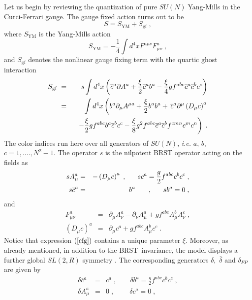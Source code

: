 \documentclass[a4paper,12pt]{article}
\begin{document}
Let us begin by reviewing the quantization of pure $SU(N)\;$Yang-Mills in
the Curci-Ferrari gauge. The gauge fixed action turns out to be 
\begin{equation}
S=S_{\mathrm{YM}}+S_{\mathrm{gf}}\;,  \label{scf}
\end{equation}
where $S_{\mathrm{YM}}$ is the Yang-Mills action 
\[
S_{\mathrm{YM}}=-\frac{1}{4}\int d^{4}xF^{a\mu \nu }F_{\mu \nu }^{a}\;,
\]
and $S_{\mathrm{gf}}$ denotes the nonlinear gauge fixing term with the
quartic ghost interaction 
\begin{eqnarray}
S_{\mathrm{gf}}\; &=&s\int d^{4}x\left( \overline{c}^{a}\partial A^{a}+\frac{%
\xi }{2}\overline{c}^{a}b^{a}-\frac{\xi }{4}gf^{abc}\overline{c}^{a}%
\overline{c}^{b}c^{c}\right)   \label{cfg} \\
&=&\int d^{4}x\left( b^{a}\partial _{\mu }A^{\mu a}+\frac{\xi }{2}%
b^{a}b^{a}+\,\overline{c}^{a}\partial ^{\mu }\left( D_{\mu }c\right)
^{a}\right.   \nonumber \\
&&\,\,\,\,\left. -\frac{\xi }{2}gf^{abc}b^{a}\overline{c}^{b}c^{c}-\frac{\xi 
}{8}g^{2}f^{abc}\overline{c}^{a}\overline{c}^{b}f^{cmn}c^{m}c^{n}\right) \;.
\nonumber
\end{eqnarray}
The color indices run here over all generators of $SU(N)$, \textit{i.e. }$a$,%
$b$,$c=1,....,N^{2}-1$. The operator $s$ is the nilpotent BRST operator
acting on the fields as 
\begin{eqnarray}
sA_{\mu }^{a} &=&-\left( D_{\mu }c\right) ^{a}\;,\;\;\;\;\;\;sc^{a}=\frac{g}{%
2}f^{abc}c^{b}c^{c}\;,  \label{s} \\
s\overline{c}^{a} &=&b^{a}\;\;\;\;\;\;\;,\;\;\;\;\;\;sb^{a}=0\;,  \nonumber
\end{eqnarray}
and 
\begin{eqnarray}
F_{\mu \nu }^{a} &=&\partial _{\mu }A_{\nu }^{a}-\partial _{\nu }A_{\mu
}^{a}+gf^{abc}A_{\mu }^{b}A_{\nu }^{c}\;,  \label{d} \\
\left( D_{\mu }c\right) ^{a} &=&\partial _{\mu }c^{a}+gf^{abc}A_{\mu
}^{b}c^{c}\;.  \nonumber
\end{eqnarray}
Notice that expression $\left( \ref{cfg}\right) $ contains a unique
parameter $\xi $. Moreover, as already mentioned, in addition to the BRST\
invariance, the model displays a further global $SL(2,R)$ symmetry \cite{oj}%
. The corresponding generators $\delta ,$ $\overline{\delta }$ and $\delta
_{FP}$ are given by 
\begin{eqnarray}
\delta \overline{c}^{a} &=&c^{a}\;,\;\;\;\;\;\;\;\delta b^{a}=\frac{g}{2}%
f^{abc}c^{b}c^{c}\;,  \label{delta} \\
\delta A_{\mu }^{a} &=&0\;,\;\;\;\;\;\;\;\;\delta c^{a}=0\;,  \nonumber
\end{eqnarray}
\end{document}

